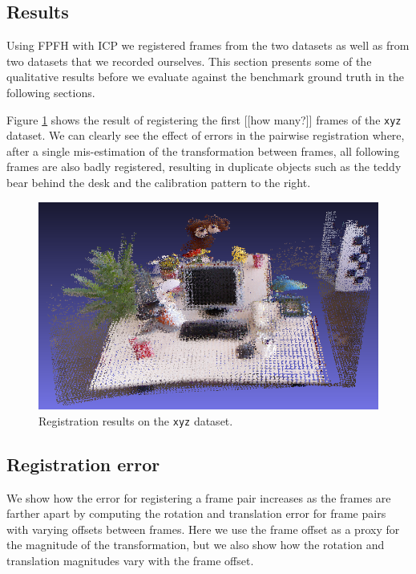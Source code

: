 \documentclass[a4paper]{article}
\begin{document}
\subsection{Results}

Using \ac{FPFH} with \ac{ICP} we registered frames from the two datasets as well as from two datasets that we recorded ourselves. This section presents some of the qualitative results before we evaluate against the benchmark ground truth in the following sections.

Figure \ref{fig:xyz_results} shows the result of registering the first [[how many?]] frames of the \texttt{xyz} dataset. We can clearly see the effect of errors in the pairwise registration where, after a single mis-estimation of the transformation between frames, all following frames are also badly registered, resulting in duplicate objects such as the teddy bear behind the desk and the calibration pattern to the right.

\begin{figure}[htbp]
    \centering
        \includegraphics[width=\textwidth]{ims/xyz_results.png}
    \caption{Registration results on the \texttt{xyz} dataset.}
    \label{fig:xyz_results}
\end{figure}


\subsection{Registration error}
\label{registration_error}

We show how the error for registering a frame pair increases as the frames are farther apart by computing the rotation and translation error for frame pairs with varying offsets between frames. Here we use the frame offset as a proxy for the magnitude of the transformation, but we also show how the rotation and translation magnitudes vary with the frame offset.
\end{document}
